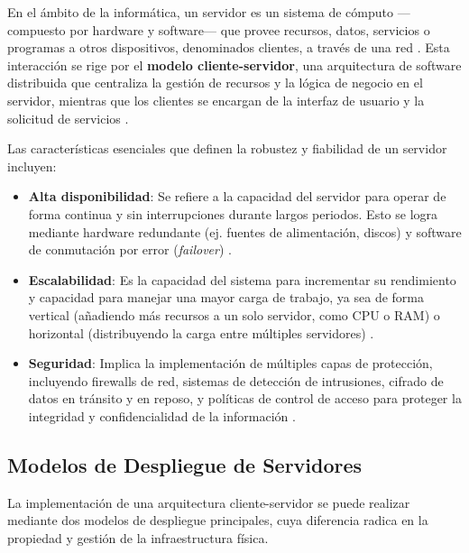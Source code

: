 En el ámbito de la informática, un servidor es un sistema de cómputo —compuesto por hardware y software— que provee recursos, datos, servicios o programas a otros dispositivos, denominados clientes, a través de una red \cite{Espana2003}. Esta interacción se rige por el \textbf{modelo cliente-servidor}, una arquitectura de software distribuida que centraliza la gestión de recursos y la lógica de negocio en el servidor, mientras que los clientes se encargan de la interfaz de usuario y la solicitud de servicios \cite{Britannica2024}.

Las características esenciales que definen la robustez y fiabilidad de un servidor incluyen:

\begin{itemize}
    \item \textbf{Alta disponibilidad}: Se refiere a la capacidad del servidor para operar de forma continua y sin interrupciones durante largos periodos. Esto se logra mediante hardware redundante (ej. fuentes de alimentación, discos) y software de conmutación por error (\textit{failover}) \cite{Stanek2014}.
    \item \textbf{Escalabilidad}: Es la capacidad del sistema para incrementar su rendimiento y capacidad para manejar una mayor carga de trabajo, ya sea de forma vertical (añadiendo más recursos a un solo servidor, como CPU o RAM) o horizontal (distribuyendo la carga entre múltiples servidores) \cite{Mancera2015}.
    \item \textbf{Seguridad}: Implica la implementación de múltiples capas de protección, incluyendo firewalls de red, sistemas de detección de intrusiones, cifrado de datos en tránsito y en reposo, y políticas de control de acceso para proteger la integridad y confidencialidad de la información \cite{Espana2003}.
\end{itemize}

\subsection{Modelos de Despliegue de Servidores}
\label{subsec:modelos_despliegue}

La implementación de una arquitectura cliente-servidor se puede realizar mediante dos modelos de despliegue principales, cuya diferencia radica en la propiedad y gestión de la infraestructura física.

